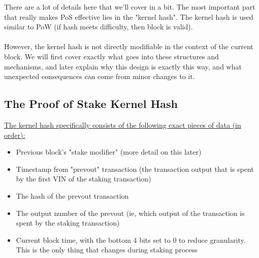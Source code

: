 \noindent
There are a lot of details here that we'll cover in a bit. The most important
part that really makes PoS effective lies in the "kernel hash". The kernel
hash is used similar to PoW (if hash meets difficulty, then block is valid).
\\
\\
\noindent
However, the kernel hash is not directly modifiable in the context of the
current block. We will first cover exactly what goes into these structures
and mechanisms, and later explain why this design is exactly this way, and
what unexpected consequences can come from minor changes to it.
\newpage



\subsection{The Proof of Stake Kernel Hash}

\underline{The kernel hash specifically consists of the following exact 
pieces of data (in order):}

\begin{itemize}
	\item Previous block's "stake modifier" (more detail on this later)
	\item Timestamp from "prevout" transaction (the transaction output that
	is spent by the first VIN of the staking transaction)
	\item The hash of the prevout transaction
	\item The output number of the prevout (ie, which output of the
	transaction is spent by the staking transaction)
	\item Current block time, with the bottom 4 bits set to 0 to reduce
	granularity. This is the only thing that changes during staking process
\end{itemize}



